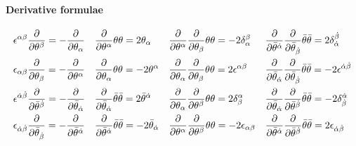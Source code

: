 \documentclass[CheatSheet]{subfiles}
\begin{document}
\paragraph{Derivative formulae}

\begin{align*}
&
\epsilon^{\alpha\beta}\frac{\partial}{\partial\theta^\beta}=-\frac{\partial}{\partial\theta_\alpha}
&&
\frac{\partial}{\partial \theta^{\alpha}}\theta \theta =2 \theta_{\alpha}
&&
\frac{\partial}{\partial \theta^{\alpha}}\frac{\partial}{\partial \theta_{\beta}}\theta \theta =-2 \delta^{\beta}_{\alpha}
&&
\frac{\partial}{\partial \bar\theta^{{\dot\alpha}}}\frac{\partial}{\partial \bar\theta_{{\dot\beta}}}\bar\theta\bar\theta=2 \delta^{{\dot\beta}}_{{\dot\alpha}}
\\&
\epsilon_{\alpha\beta}\frac{\partial}{\partial\theta_\beta}=-\frac{\partial}{\partial\theta^\alpha}
&&
\frac{\partial}{\partial \theta_{\alpha}}\theta \theta =-2 \theta^{\alpha}
&&
\frac{\partial}{\partial \theta_{\alpha}}\frac{\partial}{\partial \theta_{\beta}}\theta \theta =2 \epsilon^{\alpha \beta}
&&
\frac{\partial}{\partial \bar\theta_{{\dot\alpha}}}\frac{\partial}{\partial \bar\theta_{{\dot\beta}}}\bar\theta\bar\theta=-2 \epsilon^{{\dot\alpha}{\dot\beta}}
\\&
\epsilon^{{\dot\alpha}{\dot\beta}}\frac{\partial}{\partial\bar\theta^{\dot\beta}}=-\frac{\partial}{\partial\bar\theta_{\dot\alpha}}
&&
\frac{\partial}{\partial \bar\theta_{{\dot\alpha}}}\bar\theta\bar\theta=2 \bar\theta^{{\dot\alpha}}
&&
\frac{\partial}{\partial \theta_{\alpha}}\frac{\partial}{\partial \theta^{\beta}}\theta \theta =2 \delta^{\alpha}_{\beta}
&&
\frac{\partial}{\partial \bar\theta_{{\dot\alpha}}}\frac{\partial}{\partial \bar\theta^{{\dot\beta}}}\bar\theta\bar\theta=-2 \delta^{{\dot\alpha}}_{{\dot\beta}}
\\&
\epsilon_{{\dot\alpha}{\dot\beta}}\frac{\partial}{\partial\bar\theta_{\dot\beta}}=-\frac{\partial}{\partial\bar\theta^{\dot\alpha}}
&&
\frac{\partial}{\partial \bar\theta^{{\dot\alpha}}}\bar\theta\bar\theta=-2 \bar\theta_{{\dot\alpha}}
&&
\frac{\partial}{\partial \theta^{\alpha}}\frac{\partial}{\partial \theta^{\beta}}\theta \theta =-2 \epsilon_{\alpha \beta}
&&
\frac{\partial}{\partial \bar\theta^{{\dot\alpha}}}\frac{\partial}{\partial \bar\theta^{{\dot\beta}}}\bar\theta\bar\theta=2 \epsilon_{{\dot\alpha}{\dot\beta}}
\end{align*}
\end{document}
